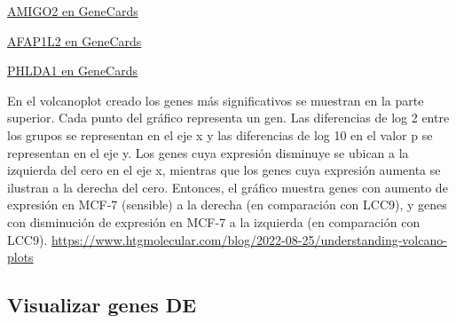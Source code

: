 \documentclass[
]{article}
\newenvironment{Shaded}{\begin{snugshade}}{\end{snugshade}}
\newcommand{\CommentTok}[1]{\textcolor[rgb]{0.56,0.35,0.01}{\textit{#1}}}
\newcommand{\DecValTok}[1]{\textcolor[rgb]{0.00,0.00,0.81}{#1}}
\newcommand{\FunctionTok}[1]{\textcolor[rgb]{0.13,0.29,0.53}{\textbf{#1}}}
\newcommand{\NormalTok}[1]{#1}
\newcommand{\OtherTok}[1]{\textcolor[rgb]{0.56,0.35,0.01}{#1}}
\newcommand{\SpecialCharTok}[1]{\textcolor[rgb]{0.81,0.36,0.00}{\textbf{#1}}}
\newcommand{\StringTok}[1]{\textcolor[rgb]{0.31,0.60,0.02}{#1}}
\begin{document}
\href{https://www.genecards.org/cgi-bin/carddisp.pl?gene=AMIGO2&keywords=AMIGO2}{AMIGO2
en GeneCards}

\href{https://www.genecards.org/cgi-bin/carddisp.pl?gene=AFAP1L2&keywords=AFAP1L2}{AFAP1L2
en GeneCards}

\href{https://www.genecards.org/cgi-bin/carddisp.pl?gene=PHLDA1&keywords=PHLDA1}{PHLDA1
en GeneCards}

En el volcanoplot creado los genes más significativos se muestran en la
parte superior. Cada punto del gráfico representa un gen. Las
diferencias de log 2 entre los grupos se representan en el eje x y las
diferencias de log 10 en el valor p se representan en el eje y. Los
genes cuya expresión disminuye se ubican a la izquierda del cero en el
eje x, mientras que los genes cuya expresión aumenta se ilustran a la
derecha del cero. Entonces, el gráfico muestra genes con aumento de
expresión en MCF-7 (sensible) a la derecha (en comparación con LCC9), y
genes con disminución de expresión en MCF-7 a la izquierda (en
comparación con LCC9).
\url{https://www.htgmolecular.com/blog/2022-08-25/understanding-volcano-plots}

\subsection{Visualizar genes DE}\label{visualizar-genes-de}

\begin{Shaded}
\end{Shaded}
\end{document}
